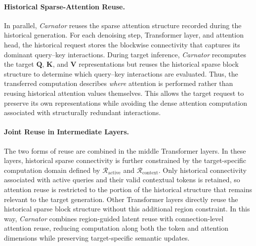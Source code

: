 \paragraph{Historical Sparse-Attention Reuse.}
In parallel, \emph{Carnator} reuses the sparse attention structure recorded during the historical generation. For each denoising step, Transformer layer, and attention head, the historical request stores the blockwise connectivity that captures its dominant query--key interactions. During target inference, \emph{Carnator} recomputes the target $\mathbf{Q}$, $\mathbf{K}$, and $\mathbf{V}$ representations but reuses the historical sparse block structure to determine which query--key interactions are evaluated. Thus, the transferred computation describes \emph{where} attention is performed rather than reusing historical attention values themselves. This allows the target request to preserve its own representations while avoiding the dense attention computation associated with structurally redundant interactions.

\paragraph{Joint Reuse in Intermediate Layers.}
The two forms of reuse are combined in the middle Transformer layers. In these layers, historical sparse connectivity is further constrained by the target-specific computation domain defined by $\mathcal{R}_{\mathrm{active}}$ and $\mathcal{R}_{\mathrm{context}}$. Only historical connectivity associated with active queries and their valid contextual tokens is retained, so attention reuse is restricted to the portion of the historical structure that remains relevant to the target generation. Other Transformer layers directly reuse the historical sparse block structure without this additional region constraint. In this way, \emph{Carnator} combines region-guided latent reuse with connection-level attention reuse, reducing computation along both the token and attention dimensions while preserving target-specific semantic updates.
